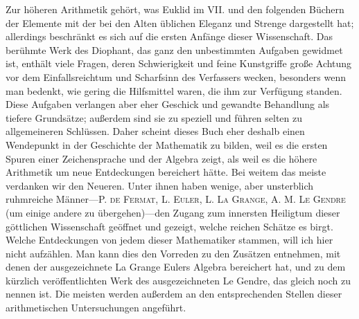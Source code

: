 Zur höheren Arithmetik gehört, was Euklid im VII. und den folgenden Büchern der Elemente mit der bei den Alten üblichen Eleganz und Strenge dargestellt hat; allerdings beschränkt es sich auf die ersten Anfänge dieser Wissenschaft. Das berühmte Werk des Diophant, das ganz den unbestimmten Aufgaben gewidmet ist, enthält viele Fragen, deren Schwierigkeit und feine Kunstgriffe große Achtung vor dem Einfallsreichtum und Scharfsinn des Verfassers wecken, besonders wenn man bedenkt, wie gering die Hilfsmittel waren, die ihm zur Verfügung standen. Diese Aufgaben verlangen aber eher Geschick und gewandte Behandlung als tiefere Grundsätze; außerdem sind sie zu speziell und führen selten zu allgemeineren Schlüssen. Daher scheint dieses Buch eher deshalb einen Wendepunkt in der Geschichte der Mathematik zu bilden, weil es die ersten Spuren einer Zeichensprache und der Algebra zeigt, als weil es die höhere Arithmetik um neue Entdeckungen bereichert hätte. Bei weitem das meiste verdanken wir den Neueren. Unter ihnen haben wenige, aber unsterblich ruhmreiche Männer---P. \textsc{de Fermat}, L. \textsc{Euler}, L. \textsc{La Grange}, A. M. \textsc{Le Gendre} (um einige andere zu übergehen)---den Zugang zum innersten Heiligtum dieser göttlichen Wissenschaft geöffnet und gezeigt, welche reichen Schätze es birgt. Welche Entdeckungen von jedem dieser Mathematiker stammen, will ich hier nicht aufzählen. Man kann dies den Vorreden zu den Zusätzen entnehmen, mit denen der ausgezeichnete La Grange Eulers Algebra bereichert hat, und zu dem kürzlich veröffentlichten Werk des ausgezeichneten Le Gendre, das gleich noch zu nennen ist. Die meisten werden außerdem an den entsprechenden Stellen dieser arithmetischen Untersuchungen angeführt.

